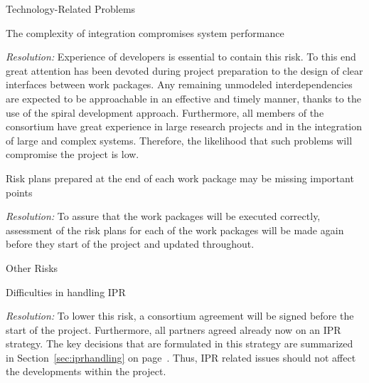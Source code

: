
\begin{riskslabeled}{Technology-Related Problems}

\item The complexity of integration compromises system performance


{\em Resolution:} Experience of developers is essential to contain this risk. To this end great attention has been devoted during project preparation to the design of clear interfaces between work packages. Any remaining unmodeled interdependencies are expected to be approachable in an effective and timely manner, thanks to the use of the spiral development approach. Furthermore, all members of the
consortium have great experience in large research projects and in the
integration of large and complex systems. Therefore, the likelihood
that such problems will compromise the project is low.


\item Risk plans prepared at the end of each work package may be
  missing important points 

{\em Resolution:} To assure that the work packages will be executed
correctly, assessment of the risk plans for each of the work packages
will be made again before they start of the project and updated throughout.

\end{riskslabeled}

\vspace{5mm}


\begin{riskslabeled}{Other Risks}

 \item Difficulties in handling IPR 

{\em Resolution:} To lower this risk, a consortium agreement will be
 signed before the start of the project.  Furthermore, all partners
 agreed already now on an IPR strategy. The key decisions that are
 formulated in this strategy are summarized in Section~\ref{sec:iprhandling} on
 page~\pageref{sec:iprhandling}. Thus, IPR related issues should not affect the
 developments within the project.
 \end{riskslabeled}




